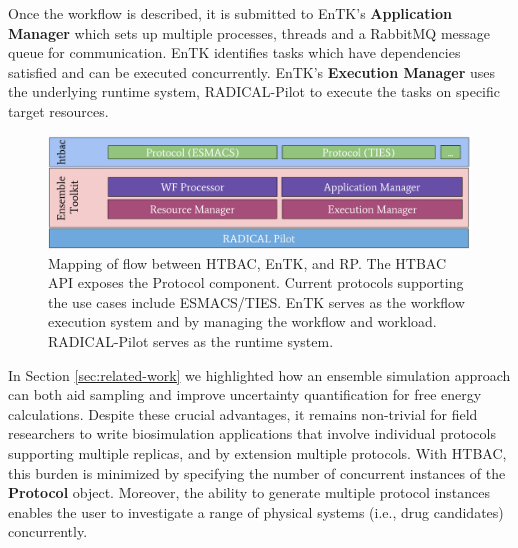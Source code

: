 


  Once the workflow is described, it is submitted to EnTK's
\textbf{Application Manager} which sets up multiple processes, threads and a
RabbitMQ message queue for communication.
EnTK identifies tasks which have dependencies satisfied and can be executed
concurrently. EnTK's \textbf{Execution Manager} uses the underlying runtime
system, RADICAL-Pilot to execute the tasks on specific target resources.

\begin{figure}
  \centering
   \includegraphics[width=\columnwidth]{figures/isc_htbac_integration_with_entk_RP-4.pdf}
  \caption{Mapping of flow between HTBAC, EnTK, and RP. The HTBAC API exposes the Protocol
  component. Current protocols supporting the use cases include ESMACS/TIES.  
  EnTK serves as the workflow execution system and by managing the workflow and workload. 
  RADICAL-Pilot serves as the runtime system.}
\label{fig:integration}
\end{figure}



In Section \ref{sec:related-work} we highlighted how an ensemble
simulation approach can both aid sampling and improve uncertainty
quantification for free energy calculations. Despite these crucial advantages,
it remains non-trivial for field researchers to write biosimulation
applications that involve individual protocols supporting multiple replicas,
and by extension multiple protocols. With HTBAC, this burden is minimized by
specifying the number of concurrent instances of the \textbf{Protocol} object.
Moreover, the ability to generate multiple protocol instances enables the user
to investigate a range of physical systems (i.e., drug candidates)
concurrently.

